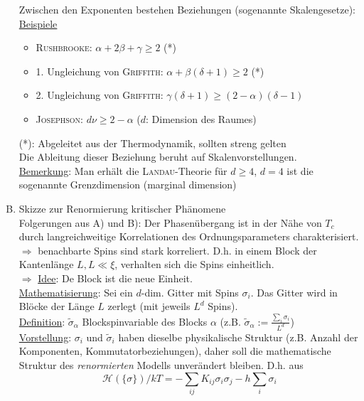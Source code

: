\begin{enumerate}[A)]
    Zwischen den Exponenten bestehen Beziehungen (sogenannte Skalengesetze): \\
    \underline{Beispiele}
    \begin{itemize}
        \item \textsc{Rushbrooke}: $\alpha + 2 \beta + \gamma \geq 2$ (*)
        \item 1. Ungleichung von \textsc{Griffith}: $\alpha + \beta (\delta + 1) \geq 2$ (*)
        \item 2. Ungleichung von \textsc{Griffith}: $\gamma (\delta + 1) \geq (2-\alpha)(\delta-1)$
        \item \textsc{Josephson}: $d \nu \geq 2 - \alpha$ ($d$: Dimension des Raumes)
    \end{itemize}
    (*): Abgeleitet aus der Thermodynamik, sollten streng gelten \\
    Die Ableitung dieser Beziehung beruht auf Skalenvorstellungen. \\  %
    \underline{Bemerkung}: Man erhält die \textsc{Landau}-Theorie für $d \geq 4$, $d=4$ ist die sogenannte Grenzdimension (marginal dimension)
    \item Skizze zur Renormierung kritischer Phänomene \\
    Folgerungen aus A) und B): Der Phasenübergang ist in der Nähe von $T_c$ durch langreichweitige Korrelationen des Ordnungsparameters charakterisiert.
    $\Rightarrow$ benachbarte Spins sind stark korreliert. D.h.  in einem Block der Kantenlänge $L, L \ll \xi$, verhalten sich die Spins einheitlich. \\
    $\Rightarrow$ \underline{Idee}: De Block ist die neue Einheit. \\
    \underline{Mathematisierung}: Sei ein $d$-dim. Gitter mit Spins $\sigma_i$. Das Gitter wird in Blöcke der Länge $L$ zerlegt (mit jeweils $L^d$ Spins). \\
    \underline{Definition}: $\tilde{\sigma}_\alpha$ Blockspinvariable des Blocks $\alpha$ (z.B. $\tilde{\sigma}_\alpha := \frac{\sum_i \sigma_i}{L^d}$) \\
    \underline{Vorstellung}: $\sigma_i$ und $\tilde{\sigma}_i$ haben dieselbe physikalische Struktur (z.B. Anzahl der Komponenten, Kommutatorbeziehungen),
    daher soll die mathematische Struktur des \emph{renormierten} Modells unverändert bleiben. D.h. aus
    \begin{equation}
        \mathscr{H}(\{\sigma\})/kT = - \sum_{ij} K_{ij} \sigma_i \sigma_j - h \sum_i \sigma_i
    \end{equation}

\end{enumerate}
